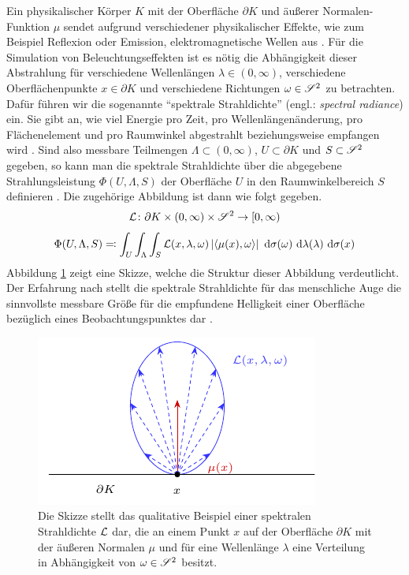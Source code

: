 		Ein physikalischer Körper $K$ mit der Oberfläche $\partial K$ und äußerer Normalen-Funktion $\mu$ sendet aufgrund verschiedener physikalischer Effekte, wie zum Beispiel Reflexion oder Emission, elektromagnetische Wellen aus \cite{nolting-edyn}.
		Für die Simulation von Beleuchtungseffekten ist es nötig die Abhängigkeit dieser Abstrahlung für verschiedene Wellenlängen $\lambda\in(0,\infty)$, verschiedene Oberflächenpunkte $x\in\partial K$ und verschiedene Richtungen $\omega\in\mathscr{S}^{2}$ zu betrachten.
		Dafür führen wir die sogenannte \enquote{spektrale Strahldichte} (engl.: \textit{spectral radiance}) ein.
		Sie gibt an, wie viel Energie pro Zeit, pro Wellenlängenänderung, pro Flächenelement und pro Raumwinkel abgestrahlt beziehungsweise empfangen wird \cite{intro-radiometry,malacara-colorimetry,ohta-colorimetry}.
		Sind also messbare Teilmengen $\Lambda\subset (0,\infty)$, $U\subset \partial K$ und $S\subset\mathscr{S}^{2}$ gegeben, so kann man die spektrale Strahldichte über die abgegebene Strahlungsleistung $\Phi(U,\Lambda,S)$ der Oberfläche $U$ in den Raumwinkelbereich $S$ definieren \cite{intro-radiometry}.
		Die zugehörige Abbildung ist dann wie folgt gegeben.
		\[
			\mathcal{L}\colon\partial K\times(0,\infty)\times \mathscr{S}^{2}\to[0,\infty)
		\]
		\[
			\Phi(U,\Lambda,S) \eqqcolon \int_{U}^{}  \int_{\Lambda}^{}  \int_{S}^{}  \mathcal{L}(x,\lambda,\omega)\left\vert \left\langle \mu(x),\omega \right\rangle \right\vert \ \mathrm{d} \sigma(\omega) \ \mathrm{d} \lambda(\lambda) \ \mathrm{d} \sigma(x)
		\]
		Abbildung \ref{fig:radiance} zeigt eine Skizze, welche die Struktur dieser Abbildung verdeutlicht.
		Der Erfahrung nach stellt die spektrale Strahldichte für das menschliche Auge die sinnvollste messbare Größe für die empfundene Helligkeit einer Oberfläche bezüglich eines Beobachtungspunktes dar \cite{malacara-colorimetry,ohta-colorimetry}.

		\begin{figure}[h]
			\center
			\includegraphics{gg_fig/radiance_1.pdf}
			\caption[Skizzenhaftes Beispiel der Strahldichte]{Die Skizze stellt das qualitative Beispiel einer spektralen Strahldichte $\mathcal{L}$ dar, die an einem Punkt $x$ auf der Oberfläche $\partial K$ mit der äußeren Normalen $\mu$ und für eine Wellenlänge $\lambda$ eine Verteilung in Abhängigkeit von $\omega\in\mathscr{S}^{2}$ besitzt.}
			\label{fig:radiance}
		\end{figure}

